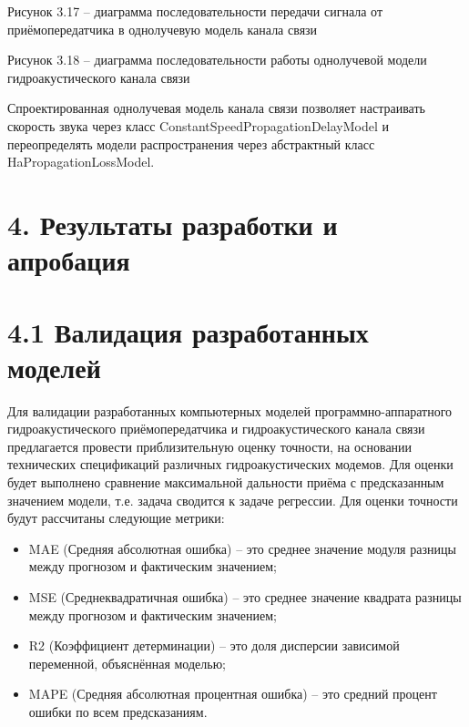 Рисунок 3.17 -- диаграмма последовательности передачи сигнала от
приёмопередатчика в однолучевую модель канала связи

Рисунок 3.18 -- диаграмма последовательности работы однолучевой модели
гидроакустического канала связи

Спроектированная однолучевая модель канала связи позволяет настраивать
скорость звука через класс ConstantSpeedPropagationDelayModel и
переопределять модели распространения через абстрактный класс
HaPropagationLossModel.

\section*{4. Результаты разработки и
апробация}\label{ux440ux435ux437ux443ux43bux44cux442ux430ux442ux44b-ux440ux430ux437ux440ux430ux431ux43eux442ux43aux438-ux438-ux430ux43fux440ux43eux431ux430ux446ux438ux44f}

\section*{4.1 Валидация разработанных
моделей}\label{ux432ux430ux43bux438ux434ux430ux446ux438ux44f-ux440ux430ux437ux440ux430ux431ux43eux442ux430ux43dux43dux44bux445-ux43cux43eux434ux435ux43bux435ux439}

Для валидации разработанных компьютерных моделей программно-аппаратного
гидроакустического приёмопередатчика и гидроакустического канала связи
предлагается провести приблизительную оценку точности, на основании
технических спецификаций различных гидроакустических модемов. Для оценки
будет выполнено сравнение максимальной дальности приёма с предсказанным
значением модели, т.е. задача сводится к задаче регрессии. Для оценки
точности будут рассчитаны следующие метрики:

\begin{itemize}
\item
  MAE (Средняя абсолютная ошибка) -- это среднее значение модуля разницы
  между прогнозом и фактическим значением;
\item
  MSE (Среднеквадратичная ошибка) -- это среднее значение квадрата
  разницы между прогнозом и фактическим значением;
\item
  R2 (Коэффициент детерминации) -- это доля дисперсии зависимой
  переменной, объяснённая моделью;
\item
  MAPE (Средняя абсолютная процентная ошибка) -- это средний процент
  ошибки по всем предсказаниям.
\end{itemize}

